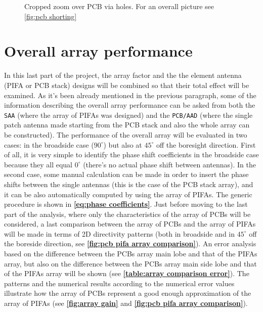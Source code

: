 \documentclass[10 pt,a4paper,twocolumn]{article}
\begin{document}
{\begin{figure}[bt!]
		\def\svgwidth{\linewidth}
		\tiny{}
	\caption{Cropped zoom over PCB via holes. For an overall picture see \cref{fig:pcb shorting}}
	\label{fig:pcb shorting zoom}
\end{figure}






\section*{Overall array performance}
In this last part of the project, the array factor and the the element antenna (PIFA or PCB stack) designs will be combined so that their total effect will be examined. As it's been already mentioned in the previous paragraph, some of the information describing the overall array performance can be asked from both the \texttt{SAA} (where the array of PIFAs was designed) and the \texttt{PCB/AAD} (where the single patch antenna made starting from the PCB stack and also the whole array can be constructed). The performance of the overall array will be evaluated in two cases: in the broadside case ($90^\circ$) but also at $45^\circ$ off the boresight direction. First of all, it is very simple to identify the phase shift coefficients in the broadside case because they all equal $0^\circ$ (there's no actual phase shift between antennas). In the second case, some manual calculation can be made in order to insert the phase shifts between the single antennas (this is the case of the PCB stack array), and it can be also automatically computed by using the array of PIFAs. The generic procedure is shown in \textbf{\cref{eq:phase coefficients}}. Just before moving to the last part of the analysis, where only the characteristics of the array of PCBs will be considered, a last comparison between the array of PCBs and the array of PIFAs will be made in terms of 2D directivity patterns (both in broadside and in $45^\circ$ off the boreside direction, see \textbf{\cref{fig:pcb pifa array comparison}}). An error analysis based on the difference between the PCBs array main lobe and that of the PIFAs array, but also on the difference between the PCBs array main side lobe and that of the PIFAs array will be shown (see \textbf{\cref{table:array comparison error}}). The patterns and the numerical results according to the numerical error values illustrate how the array of PCBs represent a good enough approximation of the array of PIFAs (see \textbf{\cref{fig:array gain}} and \textbf{\cref{fig:pcb pifa array comparison}}). 

}
\end{document}
